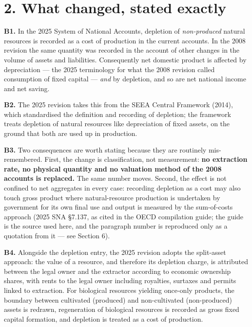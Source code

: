 \documentclass[11pt]{article}
\begin{document}
\vspace{0.8em}

\section*{2. What changed, stated exactly}\label{2-what-changed-stated-exactly}

\textbf{B1.} In the 2025 System of National Accounts, depletion of \emph{non-produced} natural resources is recorded as a cost of production in the current accounts. In the 2008 revision the same quantity was recorded in the account of other changes in the volume of assets and liabilities. Consequently net domestic product is affected by depreciation --- the 2025 terminology for what the 2008 revision called consumption of fixed capital --- \emph{and} by depletion, and so are net national income and net saving.

\textbf{B2.} The 2025 revision takes this from the SEEA Central Framework (2014), which standardised the definition and recording of depletion; the framework treats depletion of natural resources like depreciation of fixed assets, on the ground that both are used up in production.

\textbf{B3.} Two consequences are worth stating because they are routinely mis-remembered. First, the change is classification, not measurement: \textbf{no extraction rate, no physical quantity and no valuation method of the 2008 accounts is replaced.} The same number moves. Second, the effect is not confined to net aggregates in every case: recording depletion as a cost may also touch gross product where natural-resource production is undertaken by government for its own final use and output is measured by the sum-of-costs approach (2025 SNA \S7.137, as cited in the OECD compilation guide; the guide is the source used here, and the paragraph number is reproduced only as a quotation from it --- see Section 6).

\textbf{B4.} Alongside the depletion entry, the 2025 revision adopts the split-asset approach: the value of a resource, and therefore its depletion charge, is attributed between the legal owner and the extractor according to economic ownership shares, with rents to the legal owner including royalties, surtaxes and permits linked to extraction. For biological resources yielding once-only products, the boundary between cultivated (produced) and non-cultivated (non-produced) assets is redrawn, regeneration of biological resources is recorded as gross fixed capital formation, and depletion is treated as a cost of production.
\end{document}
